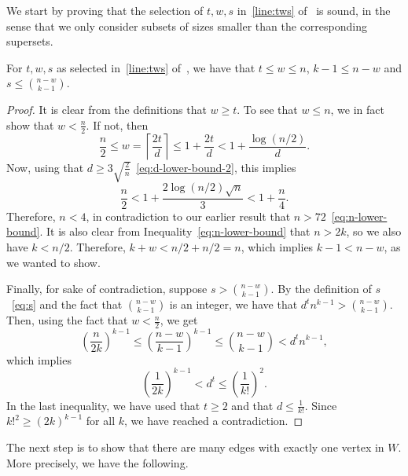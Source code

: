 We start by proving that the selection of $t, w, s$ in~\cref{line:tws} of~
is sound, in the sense that we only consider subsets of sizes smaller than the corresponding supersets.

\begin{lemma}\label{lm:sound}
    For $t, w, s$ as selected in~\cref{line:tws} of~,
    we have that
    $t  \leq w \leq n$, $k - 1 \leq n - w$ and $s \leq \binom{n - w}{k - 1}$.
    \begin{proof}
        It is clear from the definitions that $w \geq t$.
        To see that $w \leq n$, we in fact show that $w < \frac{n}{2}$.
        If not, then
        \[
            \frac{n}{2} \leq
            w =
            \left\lceil \frac{2t}{d} \right\rceil \leq
            1 + \frac{2t}{d} <
            1 + \frac{\log (n/2)}{d}.
        \]
        Now, using that $d \geq 3 \sqrt{\frac{2}{n}}$~\eqref{eq:d-lower-bound-2},
        this implies
        \[
            \frac{n}{2} <
            1 + \frac{2 \log (n/2) \sqrt{n}}{3} <
            1 + \frac{n}{4}.
        \]
        Therefore, $n < 4$, in contradiction to our earlier result that $n > 72$~\eqref{eq:n-lower-bound}.
        It is also clear from Inequality~\eqref{eq:n-lower-bound} that $n > 2k$,
        so we also have $k < n/2$.
        Therefore, $ k + w < n/2 + n/2 = n$, which implies $k - 1 < n - w$,
        as we wanted to show.

        Finally, for sake of contradiction,
        suppose $s > \binom{n - w}{k - 1}$.
        By the definition of $s$~\eqref{eq:s}
        and the fact that $\binom{n-w}{k-1}$ is an integer, we have that
        $d^t n^{k-1} > \binom{n - w}{k - 1}$.
        Then, using the fact that $w < \frac{n}{2}$, we get
        \[
            \left( \frac{n}{2k} \right)^{k-1} \leq
            \left( \frac{n-w}{k-1} \right)^{k-1} \leq
            \binom{n - w}{k - 1} < d^t n^{k-1},
        \]
        which implies
        \[
            \left( \frac{1}{2k} \right)^{k-1} < d^t \leq
            \left( \frac{1}{k!} \right)^2.
        \]
        In the last inequality, we have used that $t \geq 2$ and that $d \leq \frac{1}{k!}$.
        Since $k!^2 \geq (2k)^{k-1}$ for all $k$,
        we have reached a contradiction. \qedhere

    \end{proof}
\end{lemma}

The next step is to show that there are many edges with exactly one vertex in $W$.
More precisely, we have the following.


